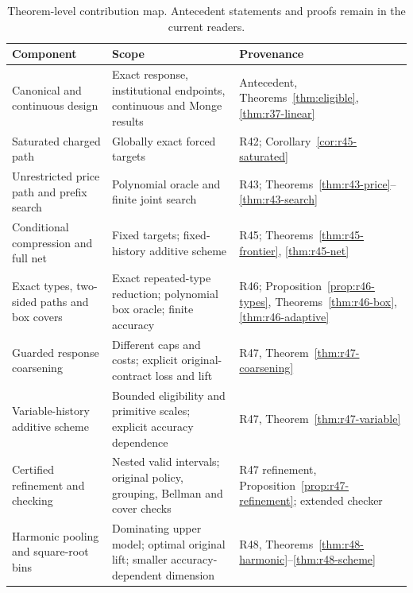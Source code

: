 \begin{table}[p]\centering
\caption{Theorem-level contribution map. Antecedent statements and proofs remain in the current readers.}\label{tab:r46-contributions}
\begin{tabular}{p{}p{}p{}}\toprule
Component & Scope & Provenance \\\midrule
Canonical and continuous design & Exact response, institutional endpoints, continuous and Monge results & Antecedent, Theorems~\ref{thm:eligible}, \ref{thm:r37-linear} \\
Saturated charged path & Globally exact forced targets & R42; Corollary~\ref{cor:r45-saturated} \\
Unrestricted price path and prefix search & Polynomial oracle and finite joint search & R43; Theorems~\ref{thm:r43-price}--\ref{thm:r43-search} \\
Conditional compression and full net & Fixed targets; fixed-history additive scheme & R45; Theorems~\ref{thm:r45-frontier}, \ref{thm:r45-net} \\
Exact types, two-sided paths and box covers & Exact repeated-type reduction; polynomial box oracle; finite accuracy & R46; Proposition~\ref{prop:r46-types}, Theorems~\ref{thm:r46-box}, \ref{thm:r46-adaptive} \\
Guarded response coarsening & Different caps and costs; explicit original-contract loss and lift & R47, Theorem~\ref{thm:r47-coarsening} \\
Variable-history additive scheme & Bounded eligibility and primitive scales; explicit accuracy dependence & R47, Theorem~\ref{thm:r47-variable} \\
Certified refinement and checking & Nested valid intervals; original policy, grouping, Bellman and cover checks & R47 refinement, Proposition~\ref{prop:r47-refinement}; extended checker \\
Harmonic pooling and square-root bins & Dominating upper model; optimal original lift; smaller accuracy-dependent dimension & R48, Theorems~\ref{thm:r48-harmonic}--\ref{thm:r48-scheme} \\
\bottomrule\end{tabular}\end{table}
